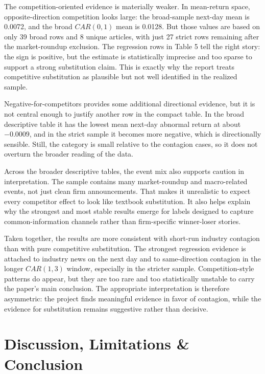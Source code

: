 \documentclass[11pt]{article}
\begin{document}
The competition-oriented evidence is materially weaker. In mean-return space, opposite-direction competition looks large: the broad-sample next-day mean is 0.0072, and the broad \(CAR(0,1)\) mean is 0.0128. But those values are based on only 39 broad rows and 8 unique articles, with just 27 strict rows remaining after the market-roundup exclusion. The regression rows in Table 5 tell the right story: the sign is positive, but the estimate is statistically imprecise and too sparse to support a strong substitution claim. This is exactly why the report treats competitive substitution as plausible but not well identified in the realized sample.

Negative-for-competitors provides some additional directional evidence, but it is not central enough to justify another row in the compact table. In the broad descriptive table it has the lowest mean next-day abnormal return at about \(-0.0009\), and in the strict sample it becomes more negative, which is directionally sensible. Still, the category is small relative to the contagion cases, so it does not overturn the broader reading of the data.

Across the broader descriptive tables, the event mix also supports caution in interpretation. The sample contains many market-roundup and macro-related events, not just clean firm announcements. That makes it unrealistic to expect every competitor effect to look like textbook substitution. It also helps explain why the strongest and most stable results emerge for labels designed to capture common-information channels rather than firm-specific winner-loser stories.

Taken together, the results are more consistent with short-run industry contagion than with pure competitive substitution. The strongest regression evidence is attached to industry news on the next day and to same-direction contagion in the longer \(CAR(1,3)\) window, especially in the stricter sample. Competition-style patterns do appear, but they are too rare and too statistically unstable to carry the paper's main conclusion. The appropriate interpretation is therefore asymmetric: the project finds meaningful evidence in favor of contagion, while the evidence for substitution remains suggestive rather than decisive.

\section{Discussion, Limitations \& Conclusion}
\end{document}

